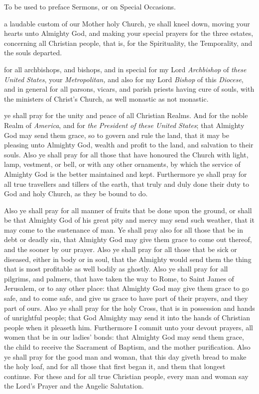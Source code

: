 \begin{rubric}
	{To be used to preface Sermons, or on Special Occasions.}
\end{rubric}

 a laudable custom of our Mother holy Church, ye shall kneel down, moving your hearts unto Almighty God, and making your special prayers for the three estates, concerning all Christian people, that is, for the Spirituality, the Temporality, and the souls departed.

 for all archbishops, and bishops, and in special for my Lord \textit{Archbishop} of \textit{these United States}, your \textit{Metropolitan,} and also for my Lord \textit{Bishop} of this \textit{Diocese}, and in general for all parsons, vicars, and parish priests having cure of souls, with the ministers of Christ's Church, as well monastic as not monastic.

 ye shall pray for the unity and peace of all Christian Realms. And for the noble Realm of \textit{America}, and for \textit{the President of these United States}; that Almighty God may send them grace, so to govern and rule the land, that it may be pleasing unto Almighty God, wealth and profit to the land, and salvation to their souls. Also ye shall pray for all those that have honoured the Church with light, lamp, vestment, or bell, or with any other ornaments, by which the service of Almighty God is the better maintained and kept. Furthermore ye shall pray for all true travellers and tillers of the earth, that truly and duly done their duty to God and holy Church, as they be bound to do.

Also ye shall pray for all manner of fruits that be done upon the ground, or shall be that Almighty God of his great pity and mercy may send such weather, that it may come to the sustenance of man. Ye shall pray also for all those that be in debt or deadly sin, that Almighty God may give them grace to come out thereof, and the sooner by our prayer. Also ye shall pray for all those that be sick or diseased, either in body or in soul, that the Almighty would send them the thing that is most profitable as well bodily as ghostly. Also ye shall pray for all pilgrims, and palmers, that have taken the way to Rome, to Saint James of Jerusalem, or to any other place: that Almighty God may give them grace to go safe, and to come safe, and give us grace to have part of their prayers, and they part of ours. Also ye shall pray for the holy Cross, that is in possession and hands of unrightful people; that God Almighty may send it into the hands of Christian people when it pleaseth him. Furthermore I commit unto your devout prayers, all women that be in our ladies' bonds: that Almighty God may send them grace, the child to receive the Sacrament of Baptism, and the mother purification. Also ye shall pray for the good man and woman, that this day giveth bread to make the holy loaf, and for all those that first began it, and them that longest continue. For these and for all true Christian people, every man and woman say the Lord's Prayer and the Angelic Salutation.

